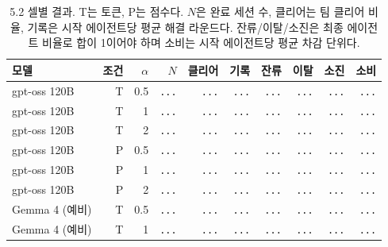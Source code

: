 \begin{table}[H]
\centering\footnotesize
\setlength{\tabcolsep}{4pt}
\caption{5.2 셀별 결과. T는 토큰, P는 점수다. $N$은 완료 세션 수, 클리어는 팀 클리어 비율, 기록은 시작 에이전트당 평균 해결 라운드다. 잔류/이탈/소진은 최종 에이전트 비율로 합이 1이어야 하며 소비는 시작 에이전트당 평균 차감 단위다.}
\label{tab:team-results}
\begin{tabular}{@{}lrrrrrrrrr@{}}
\toprule
모델 & 조건 & $\alpha$ & $N$ & 클리어 & 기록 & 잔류 & 이탈 & 소진 & 소비 \\
\midrule
gpt-oss 120B & T & 0.5 & {\color{gray}\texttt{...}} & {\color{gray}\texttt{...}} & {\color{gray}\texttt{...}} & {\color{gray}\texttt{...}} & {\color{gray}\texttt{...}} & {\color{gray}\texttt{...}} & {\color{gray}\texttt{...}} \\
gpt-oss 120B & T & 1 & {\color{gray}\texttt{...}} & {\color{gray}\texttt{...}} & {\color{gray}\texttt{...}} & {\color{gray}\texttt{...}} & {\color{gray}\texttt{...}} & {\color{gray}\texttt{...}} & {\color{gray}\texttt{...}} \\
gpt-oss 120B & T & 2 & {\color{gray}\texttt{...}} & {\color{gray}\texttt{...}} & {\color{gray}\texttt{...}} & {\color{gray}\texttt{...}} & {\color{gray}\texttt{...}} & {\color{gray}\texttt{...}} & {\color{gray}\texttt{...}} \\
gpt-oss 120B & P & 0.5 & {\color{gray}\texttt{...}} & {\color{gray}\texttt{...}} & {\color{gray}\texttt{...}} & {\color{gray}\texttt{...}} & {\color{gray}\texttt{...}} & {\color{gray}\texttt{...}} & {\color{gray}\texttt{...}} \\
gpt-oss 120B & P & 1 & {\color{gray}\texttt{...}} & {\color{gray}\texttt{...}} & {\color{gray}\texttt{...}} & {\color{gray}\texttt{...}} & {\color{gray}\texttt{...}} & {\color{gray}\texttt{...}} & {\color{gray}\texttt{...}} \\
gpt-oss 120B & P & 2 & {\color{gray}\texttt{...}} & {\color{gray}\texttt{...}} & {\color{gray}\texttt{...}} & {\color{gray}\texttt{...}} & {\color{gray}\texttt{...}} & {\color{gray}\texttt{...}} & {\color{gray}\texttt{...}} \\
Gemma 4 (예비) & T & 0.5 & {\color{gray}\texttt{...}} & {\color{gray}\texttt{...}} & {\color{gray}\texttt{...}} & {\color{gray}\texttt{...}} & {\color{gray}\texttt{...}} & {\color{gray}\texttt{...}} & {\color{gray}\texttt{...}} \\
Gemma 4 (예비) & T & 1 & {\color{gray}\texttt{...}} & {\color{gray}\texttt{...}} & {\color{gray}\texttt{...}} & {\color{gray}\texttt{...}} & {\color{gray}\texttt{...}} & {\color{gray}\texttt{...}} & {\color{gray}\texttt{...}} \\

\end{tabular}
\end{table}
